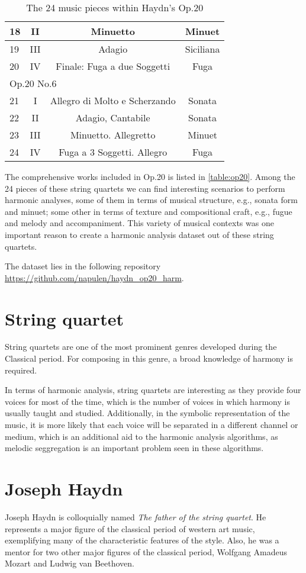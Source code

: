 \begin{table}[tbp]
\begin{tabular}{|l|c|c|c|}
18 & II & Minuetto & Minuet \\ \hline
19 & III & Adagio & Siciliana \\ \hline
20 & IV & Finale: Fuga a due Soggetti & Fuga \\ \hline
\multicolumn{4}{|l|}{Op.20 No.6} \\ \hline
21 & I & Allegro di Molto e Scherzando & Sonata \\ \hline
22 & II & Adagio, Cantabile & Sonata \\ \hline
23 & III & Minuetto. Allegretto & Minuet \\ \hline
24 & IV & Fuga a 3 Soggetti. Allegro & Fuga \\ \hline
\end{tabular}
\caption{The 24 music pieces within Haydn's Op.20}
\label{table:op20}
\end{table}

The comprehensive works included in Op.20 is listed in \autoref{table:op20}. Among the 24 pieces of these string quartets we can find interesting scenarios to perform harmonic analyses, some of them in terms of musical structure, e.g., sonata form and minuet; some other in terms of texture and compositional craft, e.g., fugue and melody and accompaniment. This variety of musical contexts was one important reason to create a harmonic analysis dataset out of these string quartets.

The dataset lies in the following repository \url{https://github.com/napulen/haydn_op20_harm}.

\section{String quartet}
String quartets are one of the most prominent genres developed during the Classical period. For composing in this genre, a broad knowledge of harmony is required.

In terms of harmonic analysis, string quartets are interesting as they provide four voices for most of the time, which is the number of voices in which harmony is usually taught and studied. Additionally, in the symbolic representation of the music, it is more likely that each voice will be separated in a different channel or medium, which is an additional aid to the harmonic analysis algorithms, as melodic seggregation is an important problem seen in these algorithms.

\section{Joseph Haydn}
Joseph Haydn is colloquially named \emph{The father of the string quartet}. He represents a major figure of the classical period of western art music,
exemplifying many of the characteristic features of the style. Also, he was a mentor for two other major figures of the classical period, Wolfgang Amadeus Mozart and Ludwig van Beethoven.

